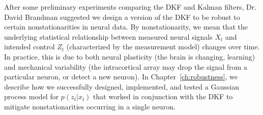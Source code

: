 After some preliminary experiments comparing the DKF and Kalman filters, Dr. David Brandman suggested we design a version of the DKF to be robust to certain nonstationarities in neural data.  By nonstationarity, we mean that the underlying statistical relationship between measured neural signals $X_t$ and intended control $Z_t$ (characterized by the measurement model) changes over time.  In practice, this is due to both neural plasticity (the brain is changing, learning) and mechanical variability (the intracortical array may drop the signal from a particular neuron, or detect a new neuron).  In Chapter~\ref{ch:robustness}, we describe how we successfully designed, implemented, and tested a Gaussian process model for $p(z_t|x_t)$ that worked in conjunction with the DKF to mitigate nonstationarities occurring in a single neuron.

